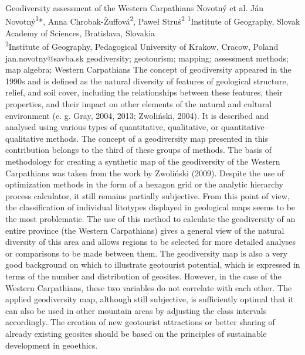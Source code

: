 \abstract
{Geodiversity assessment of the Western Carpathians} 
{Novotný et al.} 
{Ján Novotný\textsuperscript{1}*, Anna Chrobak-Žuffová\textsuperscript{2}, Paweł Struś\textsuperscript{2}} 
{\TLtag} 
{
\textsuperscript{1}Institute of Geography, Slovak Academy of Sciences, Bratislava, Slovakia\\
\textsuperscript{2}Institute of Geography, Pedagogical University of Krakow, Cracow, Poland
}
{jan.novotny@savba.sk}  %
{geodiversity; geotourism; mapping; assessment methods; map algebra; Western Carpathians}
{
The concept of geodiversity appeared in the 1990s and is defined as the natural diversity of features of geological structure, relief, and soil cover, including the relationships between these features, their properties, and their impact on other elements of the natural and cultural environment (e. g. Gray, 2004, 2013; Zwoliński, 2004). It is described and analysed using various types of quantitative, qualitative, or quantitative–qualitative methods. The concept of a geodiversity map presented in this contribution belongs to the third of these groups of methods. The basis of methodology for creating a synthetic map of the geodiversity of the Western Carpathians was taken from the work by Zwoliński (2009). Despite the use of optimization methods in the form of a hexagon grid or the analytic hierarchy process calculator, it still remains partially subjective. From this point of view, the classification of individual litotypes displayed in geological maps seems to be the most problematic. The use of this method to calculate the geodiversity of an entire province (the Western Carpathians) gives a general view of the natural diversity of this area and allows regions to be selected for more detailed analyses or comparisons to be made between them. The geodiversity map is also a very good background on which to illustrate geotourist potential, which is expressed in terms of the number and distribution of geosites. However, in the case of the Western Carpathians, these two variables do not correlate with each other. The applied geodiversity map, although still subjective, is sufficiently optimal that it can also be used in other mountain areas by adjusting the class intervals accordingly. The creation of new geotourist attractions or better sharing of already existing geosites should be based on the principles of sustainable development in geoethics.
}
